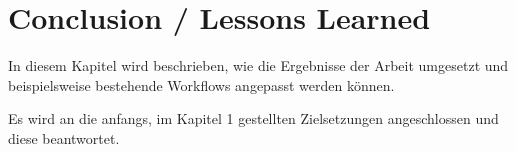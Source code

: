 \chapter{Conclusion / Lessons Learned}
In diesem Kapitel wird beschrieben, wie die Ergebnisse der Arbeit umgesetzt und beispielsweise bestehende Workflows angepasst werden können.\vspace{0.2cm}

Es wird an die anfangs, im Kapitel 1 gestellten Zielsetzungen angeschlossen und diese beantwortet.
